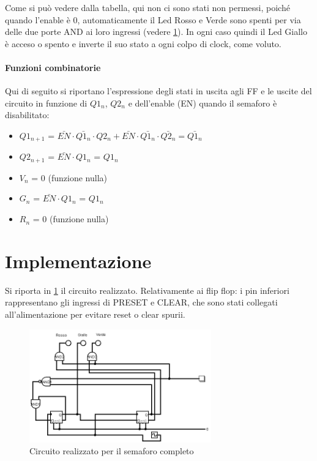 \documentclass[a4paper,10pt]{article}
\begin{document}
Come si può vedere dalla tabella, qui non ci sono stati non permessi, poiché quando l'enable è 0, automaticamente il Led Rosso e Verde sono spenti per via delle due porte AND ai loro ingressi (vedere \cref{fig:circuit}). In ogni caso quindi il Led Giallo è acceso o spento e inverte il suo stato a ogni colpo di clock, come voluto.

\paragraph{Funzioni combinatorie}
Qui di seguito si riportano l'espressione degli stati in uscita agli FF e le uscite del circuito in funzione di $Q1_n$, $Q2_n$ e dell'enable (EN) quando il semaforo è disabilitato:
\begin{itemize}
\item $Q1_{n+1}$ = $\bar{EN} \cdot \bar{Q1_n} \cdot Q2_n + \bar{EN} \cdot \bar{Q1_n} \cdot \bar{Q2_n} = \bar{Q1_n}$
\item $Q2_{n+1}$ = $\bar{EN} \cdot Q1_n$ = $Q1_n$
\item $V_{n}$ = 0 (funzione nulla)
\item $G_{n}$ = $\bar{EN} \cdot Q1_n$ = $Q1_n$
\item $R_{n}$ = 0 (funzione nulla)
\end{itemize}

\section{Implementazione}

Si riporta in \cref{fig:circuit} il circuito realizzato.
Relativamente ai flip flop: i pin inferiori rappresentano gli ingressi di PRESET e CLEAR, che sono stati collegati all'alimentazione per evitare reset o clear spurii.

\begin{figure}[H]
	\centering
	\includegraphics[width=0.7\textwidth]{../grafici/circuito1.png}
	\caption{Circuito realizzato per il semaforo completo}
	\label{fig:circuit}
\end{figure}
\end{document}
